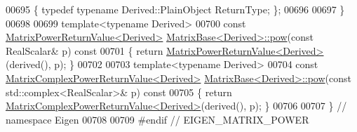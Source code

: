 \begin{DoxyCode}
00695 \{ \textcolor{keyword}{typedef} \textcolor{keyword}{typename} Derived::PlainObject ReturnType; \};
00696 
00697 \}
00698 
00699 \textcolor{keyword}{template}<\textcolor{keyword}{typename} Derived>
00700 \textcolor{keyword}{const} \hyperlink{class_eigen_1_1_matrix_power_return_value}{MatrixPowerReturnValue<Derived>} 
      \hyperlink{group___core___module_class_eigen_1_1_matrix_base}{MatrixBase<Derived>::pow}(\textcolor{keyword}{const} RealScalar& p)\textcolor{keyword}{ const}
00701 \textcolor{keyword}{}\{ \textcolor{keywordflow}{return} \hyperlink{class_eigen_1_1_matrix_power_return_value}{MatrixPowerReturnValue<Derived>}(derived(), p); \}
00702 
00703 \textcolor{keyword}{template}<\textcolor{keyword}{typename} Derived>
00704 \textcolor{keyword}{const} \hyperlink{class_eigen_1_1_matrix_complex_power_return_value}{MatrixComplexPowerReturnValue<Derived>} 
      \hyperlink{group___core___module_class_eigen_1_1_matrix_base}{MatrixBase<Derived>::pow}(\textcolor{keyword}{const} std::complex<RealScalar>& p)\textcolor{keyword}{ const}
00705 \textcolor{keyword}{}\{ \textcolor{keywordflow}{return} \hyperlink{class_eigen_1_1_matrix_complex_power_return_value}{MatrixComplexPowerReturnValue<Derived>}(derived(), p); \}
00706 
00707 \} \textcolor{comment}{// namespace Eigen}
00708 
00709 \textcolor{preprocessor}{#endif // EIGEN\_MATRIX\_POWER}
\end{DoxyCode}
